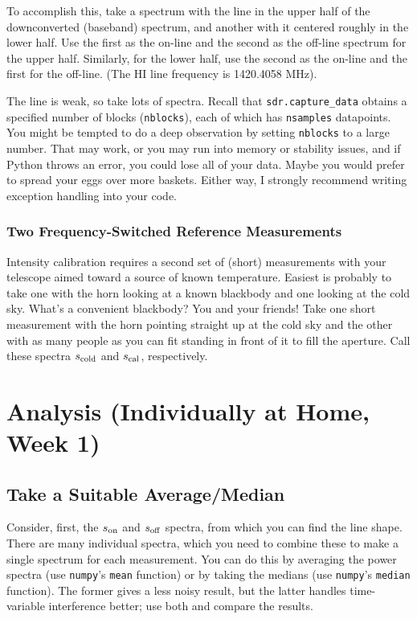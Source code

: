 \documentclass[11pt,preprint]{aastex}
\begin{document}
To accomplish this, take a spectrum with the line in the upper
half of the downconverted (baseband) spectrum, and another with it centered roughly in
the lower half. Use the first as the on-line and the second as the
off-line spectrum for the upper half. Similarly, for the lower half,
use the second as the on-line and the first for the off-line.  (The HI
line frequency is 1420.4058 MHz).

The line is weak, so take lots of spectra. Recall that
{\tt sdr.capture\_data} obtains a specified number of blocks ({\tt nblocks}),
each of which has {\tt nsamples} datapoints.
You might be tempted
to do a deep observation by setting {\tt nblocks} to a large number. That
may work, or you may run into memory or stability issues, and if Python throws
an error, you could lose all of your data. Maybe you would prefer to spread
your eggs over more baskets.
Either way, I strongly recommend writing exception handling into your code.

\subsubsection{Two Frequency-Switched Reference Measurements}
\label{sec:blackbody}

\noindent
Intensity calibration requires a second set of (short) measurements
with your telescope aimed toward a source of known temperature.
Easiest is probably to take one with the horn
looking at a known blackbody and one looking at the cold sky. What's a
convenient blackbody? You and your friends! Take one short
measurement with the horn pointing straight up at the cold sky and the
other with as many people as you can fit standing in front of it to
fill the aperture. Call these spectra
$s_{\rm cold}$ and $s_{\rm cal}$, respectively.


\section{Analysis (Individually at Home, Week 1)} \label{analysis}

\subsection{Take a Suitable Average/Median}

\noindent
Consider, first, the $s_{\rm on}$ and $s_{\rm off}$ spectra, from which
you can find the line shape. There are many individual spectra, which
you need to combine these to make a single spectrum
for each measurement. You can do this by averaging the power spectra
(use {\tt numpy}'s {\tt mean} function) or by taking the medians (use {\tt numpy}'s
{\tt median} function). The former gives a less noisy result, but the
latter handles time-variable interference better; use both and compare
the results.
\end{document}
